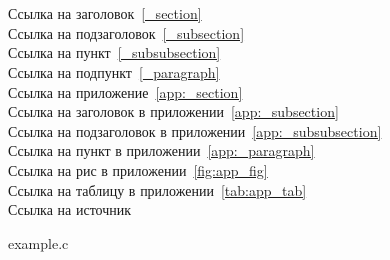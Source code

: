 \section{}

\noindent
Ссылка на заголовок~\ref{_section}\\
Ссылка на подзаголовок~\ref{_subsection}\\
Ссылка на пункт~\ref{_subsubsection}\\
Ссылка на подпункт~\ref{_paragraph}\\

\noindent
Ссылка на приложение~\ref{app:_section}\\
Ссылка на заголовок в приложении~\ref{app:_subsection}\\
Ссылка на подзаголовок в приложении~\ref{app:_subsubsection}\\
Ссылка на пункт в приложении~\ref{app:_paragraph}
\vspace{0.5em}\\
Ссылка на рис в приложении~\ref{fig:app_fig}\\
Ссылка на таблицу в приложении~\ref{tab:app_tab}\\

Ссылка на источник~\cite{wikibooks}

\begin{listing}[H]
\caption{example.c}\label{lst:example_2}
\inputminted{c}{inc/example.c}
\end{listing}
